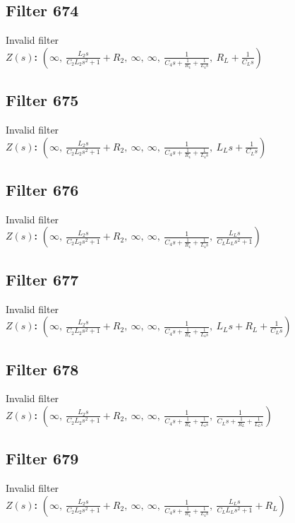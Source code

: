 \documentclass{article}
\begin{document}
\subsection*{Filter 674}
Invalid filter \\ 
\textbf{$Z(s)$:} $\left( \infty, \  \frac{L_{2} s}{C_{2} L_{2} s^{2} + 1} + R_{2}, \  \infty, \  \infty, \  \frac{1}{C_{4} s + \frac{1}{R_{4}} + \frac{1}{L_{4} s}}, \  R_{L} + \frac{1}{C_{L} s}\right)$ \\ 
\subsection*{Filter 675}
Invalid filter \\ 
\textbf{$Z(s)$:} $\left( \infty, \  \frac{L_{2} s}{C_{2} L_{2} s^{2} + 1} + R_{2}, \  \infty, \  \infty, \  \frac{1}{C_{4} s + \frac{1}{R_{4}} + \frac{1}{L_{4} s}}, \  L_{L} s + \frac{1}{C_{L} s}\right)$ \\ 
\subsection*{Filter 676}
Invalid filter \\ 
\textbf{$Z(s)$:} $\left( \infty, \  \frac{L_{2} s}{C_{2} L_{2} s^{2} + 1} + R_{2}, \  \infty, \  \infty, \  \frac{1}{C_{4} s + \frac{1}{R_{4}} + \frac{1}{L_{4} s}}, \  \frac{L_{L} s}{C_{L} L_{L} s^{2} + 1}\right)$ \\ 
\subsection*{Filter 677}
Invalid filter \\ 
\textbf{$Z(s)$:} $\left( \infty, \  \frac{L_{2} s}{C_{2} L_{2} s^{2} + 1} + R_{2}, \  \infty, \  \infty, \  \frac{1}{C_{4} s + \frac{1}{R_{4}} + \frac{1}{L_{4} s}}, \  L_{L} s + R_{L} + \frac{1}{C_{L} s}\right)$ \\ 
\subsection*{Filter 678}
Invalid filter \\ 
\textbf{$Z(s)$:} $\left( \infty, \  \frac{L_{2} s}{C_{2} L_{2} s^{2} + 1} + R_{2}, \  \infty, \  \infty, \  \frac{1}{C_{4} s + \frac{1}{R_{4}} + \frac{1}{L_{4} s}}, \  \frac{1}{C_{L} s + \frac{1}{R_{L}} + \frac{1}{L_{L} s}}\right)$ \\ 
\subsection*{Filter 679}
Invalid filter \\ 
\textbf{$Z(s)$:} $\left( \infty, \  \frac{L_{2} s}{C_{2} L_{2} s^{2} + 1} + R_{2}, \  \infty, \  \infty, \  \frac{1}{C_{4} s + \frac{1}{R_{4}} + \frac{1}{L_{4} s}}, \  \frac{L_{L} s}{C_{L} L_{L} s^{2} + 1} + R_{L}\right)$ \\ 
\end{document}
